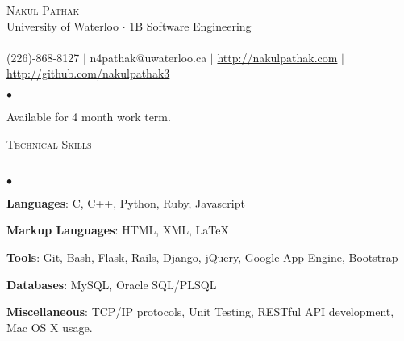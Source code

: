\documentclass[10pt]{article}
\newcommand{\lineunder}{\vspace*{-8pt} \\ \hspace*{-18pt} \hrulefill \\}
\newcommand{\header}[1]{{\hspace*{-15pt}\vspace*{6pt} \textsc{#1}} \vspace*{-6pt} \lineunder}
\newenvironment{achievements}{\begin{list}{$\bullet$}{\topsep 0pt \itemsep -1.5pt \leftmargin 5pt}}{\vspace*{4pt}\end{list}}
\begin{document}
\small
\smallskip
\vspace*{-45pt}

\begin{center}
	{\Huge \scshape {Nakul Pathak}} \\
\vspace*{6pt} 
{\fontsize{10}{1}\selectfont University of Waterloo $\cdot$ 1B Software Engineering} \\
\vspace{-4pt}
\hspace*{-18pt} \hrulefill \\
\vspace{2pt}
\hspace*{-18pt} (226)-868-8127 $|$ n4pathak@uwaterloo.ca $|$ \url{http://nakulpathak.com} $|$  \url{http://github.com/nakulpathak3}
\vspace{-5pt}
\end{center}

\vspace{5pt}
\begin{achievements}
\item Available for 4 month work term.
\end{achievements}

\vspace{5pt}
\header{\normalsize Technical Skills}
\begin{achievements}
\item \textbf{Languages}: C, C++, Python, Ruby, Javascript
\item \textbf{Markup Languages}: HTML, XML, LaTeX
\item \textbf{Tools}:  Git, Bash, Flask, Rails, Django, jQuery, Google App Engine, Bootstrap
\item \textbf{Databases}: MySQL, Oracle SQL/PLSQL
\item \textbf{Miscellaneous}: TCP/IP protocols, Unit Testing, RESTful API development, Mac OS X usage.
\end{achievements}

\vspace{5pt}
\end{document}
